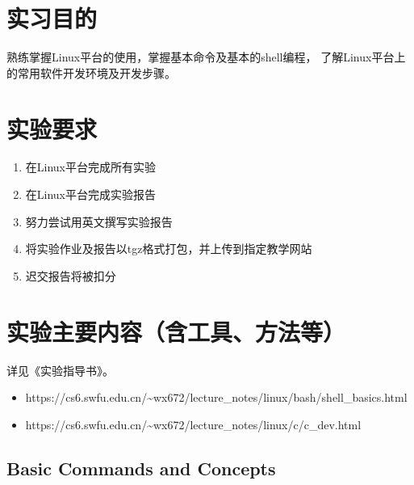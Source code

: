\documentclass{swfucoursework}
\begin{document}
\maketitle

\tableofcontents
\clearpage

\section{实习目的}\label{ux5b9eux4e60ux76eeux7684}

熟练掌握Linux平台的使用，掌握基本命令及基本的shell编程，
了解Linux平台上的常用软件开发环境及开发步骤。

\section{实验要求}\label{ux5b9eux9a8cux8981ux6c42}

\begin{enumerate}
\def\labelenumi{\arabic{enumi}.}
\tightlist
\item
  在Linux平台完成所有实验\\
\item
  在Linux平台完成实验报告\\
\item
  努力尝试用英文撰写实验报告\\
\item
  将实验作业及报告以tgz格式打包，并上传到指定教学网站\\
\item
  迟交报告将被扣分
\end{enumerate}

\section{实验主要内容（含工具、方法等）}\label{ux5b9eux9a8cux4e3bux8981ux5185ux5bb9ux542bux5de5ux5177ux65b9ux6cd5ux7b49}

详见《实验指导书》。

\begin{itemize}
\tightlist
\item
  https://cs6.swfu.edu.cn/\textasciitilde wx672/lecture\_notes/linux/bash/shell\_basics.html
\item
  https://cs6.swfu.edu.cn/\textasciitilde wx672/lecture\_notes/linux/c/c\_dev.html
\end{itemize}

\subsection{Basic Commands and
Concepts}\label{basic-commands-and-concepts}
\end{document}
